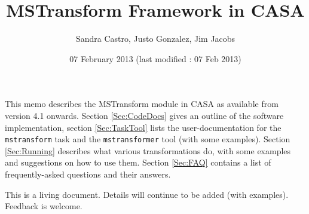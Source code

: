 \documentclass[11pt]{article}
\begin{document}
\title{MSTransform Framework in CASA}
\author{Sandra Castro, Justo Gonzalez, Jim Jacobs}
\date{07 February 2013 (last modified : 07 Feb 2013)}
\maketitle

This memo describes the MSTransform module in CASA as available from version 4.1 onwards. 
Section \ref{Sec:CodeDocs} gives an outline of the software implementation, section 
\ref{Sec:TaskTool} lists the user-documentation for the {\tt mstransform} task and the 
{\tt mstransformer} tool (with some examples).  Section \ref{Sec:Running} describes what 
various transformations do, with some examples and suggestions on how to use them. 
Section \ref{Sec:FAQ} contains a list of frequently-asked questions and their answers.

This is a living document. Details will continue to be added (with examples). Feedback is welcome.

\tableofcontents




\end{document}
